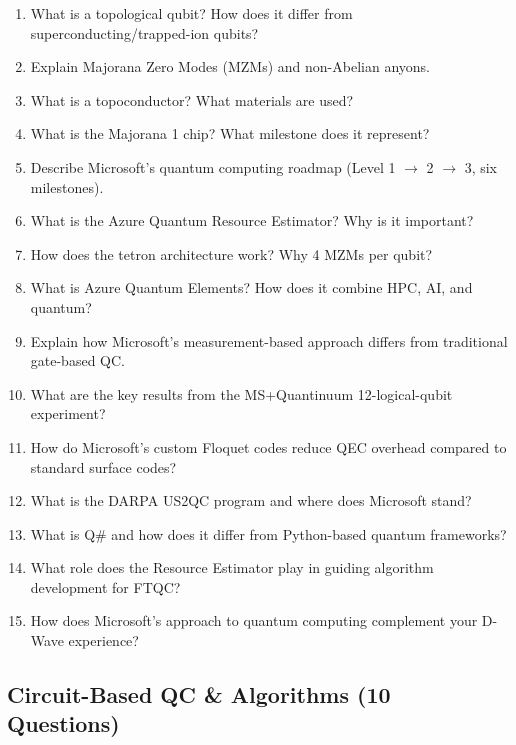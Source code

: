 \documentclass[11pt,a4paper]{article}
\begin{document}
\begin{questionbox}
\begin{enumerate}[label=\textbf{Q\arabic*.}, start=61]
    \item What is a topological qubit? How does it differ from superconducting/trapped-ion qubits?
    \item Explain Majorana Zero Modes (MZMs) and non-Abelian anyons.
    \item What is a topoconductor? What materials are used?
    \item What is the Majorana 1 chip? What milestone does it represent?
    \item Describe Microsoft's quantum computing roadmap (Level 1 $\to$ 2 $\to$ 3, six milestones).
    \item What is the Azure Quantum Resource Estimator? Why is it important?
    \item How does the tetron architecture work? Why 4 MZMs per qubit?
    \item What is Azure Quantum Elements? How does it combine HPC, AI, and quantum?
    \item Explain how Microsoft's measurement-based approach differs from traditional gate-based QC.
    \item What are the key results from the MS+Quantinuum 12-logical-qubit experiment?
    \item How do Microsoft's custom Floquet codes reduce QEC overhead compared to standard surface codes?
    \item What is the DARPA US2QC program and where does Microsoft stand?
    \item What is Q\# and how does it differ from Python-based quantum frameworks?
    \item What role does the Resource Estimator play in guiding algorithm development for FTQC?
    \item How does Microsoft's approach to quantum computing complement your D-Wave experience?
\end{enumerate}
\end{questionbox}

\subsection{Circuit-Based QC \& Algorithms (10 Questions)}
\end{document}
